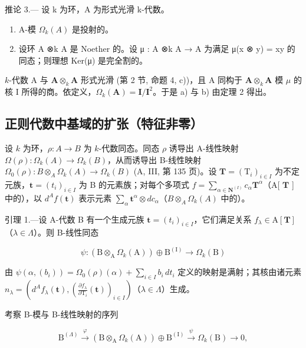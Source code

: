 推论 3.--- 设 k 为环，A 为形式光滑 k-代数。

\begin{enumerate}
\def\labelenumi{\alph{enumi})}
\item
  A-模 \(\Omega_k(A)\) 是投射的。
\item
  设环 A ⊗k A 是 Noether 的。设 μ : A ⊗k A → A 为满足 μ(x ⊗ y) = xy 的同态；则理想 Ker(μ) 是完全割的。
\end{enumerate}

\(k\)-代数 A 与 \(\mathbf{A} \otimes_{k} \mathbf{A}\) 形式光滑 (第 2 节, 命题 4, c))，且 A 同构于 \(\mathbf{A} \otimes_{k} \mathbf{A}\) 模 \(\mu\) 的核 I 所得的商。依定义，\(\Omega_{k}(\mathbf{A}) = \mathbf{I}/\mathbf{I}^{2}\)。于是 a) 与 b) 由定理 2 得出。

\subsection{正则代数中基域的扩张（特征非零）}

设 \(k\) 为环，\(\rho: A \to B\) 为 \(k\)-代数同态。同态 \(\rho\) 诱导出 A-线性映射 \(\Omega(\rho): \Omega_k(A) \to \Omega_k(B)\)，从而诱导出 B-线性映射 \(\Omega_0(\rho): B \otimes_A \Omega_k(A) \to \Omega_k(B)\) (A, III, 第 135 页)。设 \(\mathbf{T} = (\mathrm{T}_i)_{i \in I}\) 为不定元族，\(\mathbf{t} = (t_i)_{i \in I}\) 为 B 的元素族；对每个多项式 \(f = \sum_{\alpha \in \mathbf{N}^{(I)}} c_\alpha \mathbf{T}^\alpha\)（A{[} \(\mathbf{T}\) {]} 中的），以 \(d^{A} f(\mathbf{t})\) 表示元素 \(\sum_{\alpha} \mathbf{t}^\alpha \otimes dc_\alpha\)（\(B \otimes_A \Omega_k(A)\) 中的）。

引理 1.—设 A-代数 B 有一个生成元族 \(\mathbf{t} = (t_i)_{i\in I}\)，它们满足关系 \(f_\lambda \in \mathrm{A}[\mathbf{T}]\)（\(\lambda \in \Lambda\)）。则 B-线性同态

\[
\psi : (\mathrm{B} \otimes_ {\mathrm{A}} \Omega_ {k} (\mathrm{A})) \oplus \mathrm{B} ^ {(\mathrm{I})} \longrightarrow \Omega_ {k} (\mathrm{B})
\]

由 \(\psi(\alpha,(b_i)) = \Omega_0(\rho)(\alpha) + \sum_{i\in I}b_i\,dt_i\) 定义的映射是满射；其核由诸元素 \(n_{\lambda} = \left(d^{A}f_{\lambda}(\mathbf{t}),\left(\frac{\partial f_{\lambda}}{\partial\mathrm{T}_{i}}(\mathbf{t})\right)_{i\in I}\right)\)（\(\lambda \in \Lambda\)）生成。

考察 B-模与 B-线性映射的序列

\[
\mathrm{B} ^ {(\Lambda)} \xrightarrow {\varphi} (\mathrm{B} \otimes_ {\mathrm{A}} \Omega_ {k} (\mathrm{A})) \oplus \mathrm{B} ^ {(\mathrm{I})} \xrightarrow {\psi} \Omega_ {k} (\mathrm{B}) \longrightarrow 0,
\]

